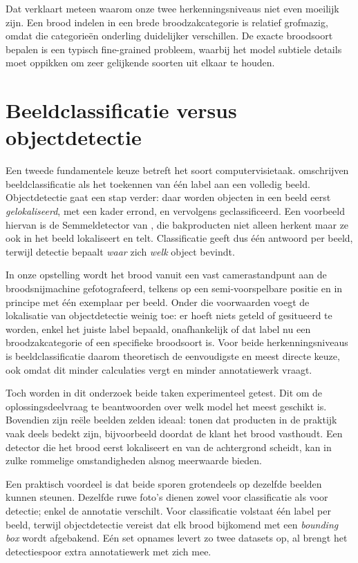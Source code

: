 Dat verklaart meteen waarom onze twee herkenningsniveaus niet even moeilijk zijn. Een
brood indelen in een brede broodzakcategorie is relatief grofmazig, omdat die
categorieën onderling duidelijker verschillen. De exacte broodsoort bepalen is een
typisch fine-grained probleem, waarbij het model subtiele details moet oppikken om
zeer gelijkende soorten uit elkaar te houden.


\section{Beeldclassificatie versus objectdetectie}


Een tweede fundamentele keuze betreft het soort computervisietaak. \textcite{Liu_2022}
omschrijven beeldclassificatie als het toekennen van één label aan een volledig beeld.
Objectdetectie gaat een stap verder: daar worden objecten in een beeld eerst
\emph{gelokaliseerd}, met een kader errond, en vervolgens geclassificeerd. Een
voorbeeld hiervan is de Semmeldetector van \textcite{Schmitt2025}, die bakproducten
niet alleen herkent maar ze ook in het beeld lokaliseert en telt. Classificatie geeft
dus één antwoord per beeld, terwijl detectie bepaalt \emph{waar} zich \emph{welk}
object bevindt.


In onze opstelling wordt het brood vanuit een vast camerastandpunt aan de
broodsnijmachine gefotografeerd, telkens op een semi-voorspelbare positie en in principe
met één exemplaar per beeld. Onder die voorwaarden voegt de lokalisatie van
objectdetectie weinig toe: er hoeft niets geteld of gesitueerd te worden, enkel het
juiste label bepaald, onafhankelijk of dat label nu een broodzakcategorie of een specifieke
broodsoort is. Voor beide herkenningsniveaus is beeldclassificatie daarom theoretisch
de eenvoudigste en meest directe keuze, ook omdat dit minder calculaties vergt en
minder annotatiewerk vraagt.


Toch worden in dit onderzoek beide taken experimenteel getest. Dit om de oplossingsdeelvraag te beantwoorden over welk model het meest geschikt is. Bovendien zijn reële beelden zelden ideaal: \textcite{Ciapas2023} tonen
dat producten in de praktijk vaak deels bedekt zijn, bijvoorbeeld doordat de klant het
brood vasthoudt. Een detector die het brood eerst lokaliseert en van de achtergrond
scheidt, kan in zulke rommelige omstandigheden alsnog meerwaarde bieden.


Een praktisch voordeel is dat beide sporen grotendeels op dezelfde beelden kunnen
steunen. Dezelfde ruwe foto's dienen zowel voor classificatie als voor detectie; enkel
de annotatie verschilt. Voor classificatie volstaat één label per beeld, terwijl
objectdetectie vereist dat elk brood bijkomend met een \emph{bounding box} wordt
afgebakend. Eén set opnames levert zo twee datasets op, al brengt het detectiespoor
extra annotatiewerk met zich mee.


